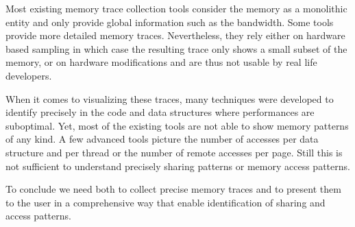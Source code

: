 Most existing memory trace collection tools consider the memory as a monolithic entity and only provide global information such as the bandwidth.
Some tools provide more detailed memory traces.
Nevertheless, they rely either on  hardware based sampling in which case the resulting trace only shows a small subset of the memory, or on hardware modifications and are thus not usable by real life developers.

When it comes to visualizing these traces, many techniques were developed to identify precisely in the code and data structures where performances are suboptimal.
Yet, most of the existing tools are not able to show memory patterns of any kind.
A few advanced tools picture the number of accesses per data structure and per thread or the number of remote accesses per page.
Still this is not sufficient to understand precisely sharing patterns or memory access patterns.

To conclude we need both to collect precise memory traces and to present them to the user in a comprehensive way that enable identification of sharing and access patterns.
